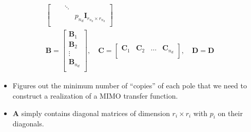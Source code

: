 \begin{enumerate}
\begin{gather*}
\begin{bmatrix}
                                                 &                                & \ddots &                                            \\
                                                 &                                &        & p_{n_d} \mathbf{I}_{r_{n_d}\times r_{n_d}} \\
              \end{bmatrix} \\
              \mathbf{B}  =\begin{bmatrix}
                  \mathbf{B}_1     \\
                  \mathbf{B}_2     \\
                  \vdots           \\
                  \mathbf{B}_{n_d} \\
              \end{bmatrix}, \quad
              \mathbf{C}  =\begin{bmatrix}
                  \mathbf{C}_1 & \mathbf{C}_2 & \dots & \mathbf{C}_{n_d} \\
              \end{bmatrix}, \quad
              \mathbf{D} = \mathbf{D}
          \end{gather*}
\end{enumerate}


\begin{itemize}
    \item Figures out the minimum number of ``copies'' of each pole that we need to construct a realization of a MIMO transfer function.
    \item $\mathbf{A}$ simply contains diagonal matrices of dimension $r_i \times r_i$ with $p_i$ on their diagonals.
\end{itemize}

%     


